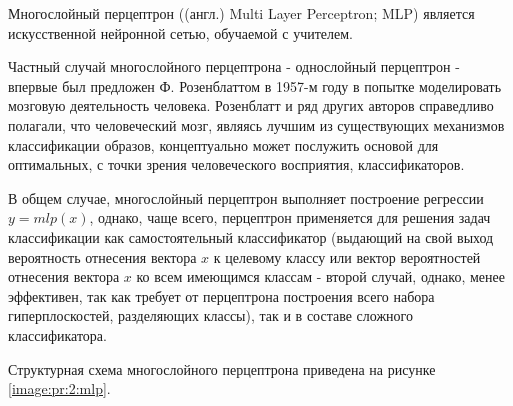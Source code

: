 
Многослойный перцептрон ((англ.) Multi Layer Perceptron; MLP) является искусственной нейронной сетью, обучаемой с учителем.

Частный случай многослойного перцептрона - однослойный перцептрон - впервые был предложен Ф. Розенблаттом в 1957-м году в попытке моделировать мозговую деятельность человека. Розенблатт и ряд других авторов справедливо полагали, что человеческий мозг, являясь лучшим из существующих механизмов классификации образов, концептуально может послужить основой для оптимальных, с точки зрения человеческого восприятия, классификаторов.

В общем случае, многослойный перцептрон выполняет построение регрессии $y = mlp(x)$, однако, чаще всего, перцептрон применяется для решения задач классификации как самостоятельный классификатор (выдающий на свой выход вероятность отнесения вектора $x$ к целевому классу или вектор вероятностей отнесения вектора $x$ ко всем имеющимся классам - второй случай, однако, менее эффективен, так как требует от перцептрона построения всего набора гиперплоскостей, разделяющих классы), так и в составе сложного классификатора.

Структурная схема многослойного перцептрона приведена на рисунке \ref{image:pr:2:mlp}.

